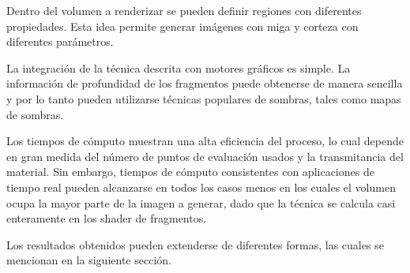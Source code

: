 \documentclass[oneside,a4paper,spanish,links]{amca}
\begin{document}
Dentro del volumen a renderizar se pueden definir regiones
con diferentes propiedades. Esta idea permite generar
imágenes con miga y corteza con diferentes parámetros.

La integración de la técnica descrita con motores gráficos es
simple. La información de profundidad de los fragmentos puede obtenerse de manera sencilla y por lo tanto pueden utilizarse técnicas
populares de sombras, tales como mapas de sombras.

Los tiempos de cómputo muestran una alta eficiencia del proceso, lo
cual depende en gran medida del número de puntos de evaluación usados
y la transmitancia del material. Sin embargo, tiempos de cómputo
consistentes con aplicaciones de tiempo real pueden alcanzarse en
todos los casos menos en los cuales el volumen ocupa la mayor parte de
la imagen a generar, dado que la técnica se calcula casi enteramente
en los shader de fragmentos. 

Los resultados obtenidos pueden extenderse de diferentes formas, las
cuales se mencionan en la siguiente sección.








\end{document}
